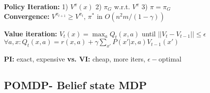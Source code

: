 \textbf{Policy Iteration:} 1) $V^\pi(x)$ 2) $\pi_G$ w.r.t. $V^\pi$ 3) $\pi = \pi_G$\\
\textbf{Convergence:} $V^{\pi_{t+1}} \geq V^{\pi_{t}}$, $\pi^*$ in $O(n^2 m / (1-\gamma))$\\
\begin{comment}
	We initialize with a random policy, although, the convergence depends heavily on the initialization\\
\end{comment}

\textbf{Value iteration:} $V_{t}(x) = \max_a Q_t(x,a)$ until $||V_t - V_{t-1}|| \leq \epsilon$\\
$\forall a,x: Q_t(x,a) = r(x, a) + \gamma \sum_{x'} P(x'|x,a) V_{t-1}(x')$\\
\begin{comment}
	Value iteration is a dynamic program, which stores the intermediate V's to use in the next round. In each round, the Q-Values of all state-action pairs must be calculated, which can be computationally intensive.\\
	\textbf{Note:} It is guaranteed to converge!\\
	\textbf{reward:} If for an action exist multiple outcomes, then the expected reward is counted. The reward function slips into the sum.\\
\end{comment}

\textbf{PI:} exact, expensive \textbf{vs. VI:} cheap, more iters, $\epsilon-$optimal\\
\begin{comment}
	Both need polynomial iterations. 
	Policy iteration need much less iterations and solves the problem exact, but it is expensive to compute one iteration.\\
	Value iteration is fast per iteration, but needs more iterations. Also, the solution is only $\epsilon-$optimal, compared to PI.\\
\end{comment}

\subsection{POMDP- Belief state MDP}
\begin{comment}
	If the state space is very large or continuous, we can't solve the MDP exactly anymore. This model generalises MDP's, using a so-called belief state, e.g. the actor don't know anymore at what state we are, but has a belief of it.\\ 
	Typically, they are untractable.\\
\end{comment}


